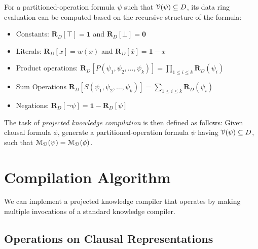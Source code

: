 \documentclass[letterpaper,USenglish,cleveref, autoref, thm-restate]{lipics-v2021}
\newcommand{\tautology}{\top}
\newcommand{\nil}{\bot}
\newcommand{\obar}[1]{\overline{#1}}
\newcommand{\dvarset}{D}
\newcommand{\dependencyset}{{\cal V}}
\newcommand{\drep}{\textbf{R}_D}
\newcommand{\addident}{\textbf{0}}
\newcommand{\mulident}{\textbf{1}}
\newcommand{\dmodelset}{{\cal M_{D}}}
\begin{document}
For a partitioned-operation formula $\psi$ such that $\dependencyset(\psi) \subseteq \dvarset$, its data ring evaluation can be computed based on the recursive structure of the formula:
\begin{itemize}
\item Constants: $\drep[\tautology] = \mulident$ and $\drep[\nil] = \addident$
\item Literals: $\drep[x] = w(x)$ and $\drep[\obar{x}] = \mulident - x$
\item Product operations: 
$\drep[P(\psi_1, \psi_2, \ldots, \psi_k)] = \prod_{1 \leq i \leq k} \drep(\psi_i)$
\item Sum Operations
$\drep[S(\psi_1, \psi_2, \ldots, \psi_k)] = \sum_{1 \leq i \leq k} \drep(\psi_i)$
\item Negations: $\drep[\neg \psi] = \mulident -\drep[\psi]$
\end{itemize}

The task of \emph{projected knowledge compilation} is then defined as follows: Given clausal formula $\phi$, generate a partitioned-operation formula $\psi$ having $\dependencyset(\psi) \subseteq \dvarset$, such that
$\dmodelset(\psi) = \dmodelset(\phi)$.

\section{Compilation Algorithm}

We can implement a projected knowledge compiler that operates by making multiple invocations of a standard knowledge compiler.

\subsection{Operations on Clausal Representations}
\end{document}

